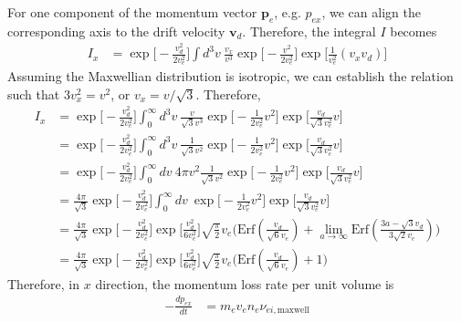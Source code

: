 \documentclass{article}
\begin{document}
For one component of the momentum vector $\bm{p}_e$, e.g. $p_{ex}$, we can align the corresponding axis to the drift velocity $\bm{v}_d$. Therefore, the integral $I$ becomes
\begin{equation}
	\begin{split}
		I_x &=\exp\Big[-\frac{v_d^2}{2v_e^2} \Big] \int d^3v\ \frac{v_x}{v^3} \exp\Big[-\frac{v^2}{2v_e^2} \Big] \exp\Big[\frac{1}{v_e^2}(v_x v_d ) \Big]
	\end{split}
\end{equation}
Assuming the Maxwellian distribution is isotropic, we can establish the relation such that $3v_x^2 = v^2$, or $v_x = v/ \sqrt{3}$. Therefore,
\begin{equation}
	\begin{split}
		I_x &= \exp\Big[-\frac{v_d^2}{2v_e^2} \Big] \int_0^\infty d^3v\ \frac{v}{\sqrt{3} v^3} \exp\Big[-\frac{1}{2v_e^2}v^2 \Big] \exp\Big[\frac{v_d}{\sqrt{3} v_e^2}v \Big] \\
		&= \exp\Big[-\frac{v_d^2}{2v_e^2} \Big] \int_0^\infty d^3v\ \frac{1}{\sqrt{3} v^2} \exp\Big[-\frac{1}{2v_e^2}v^2 \Big] \exp\Big[\frac{v_d}{\sqrt{3} v_e^2}v \Big] \\
		&= \exp\Big[-\frac{v_d^2}{2v_e^2} \Big] \int_0^\infty dv\ 4\pi v^2 \frac{1}{\sqrt{3} v^2} \exp\Big[-\frac{1}{2v_e^2}v^2 \Big] \exp\Big[\frac{v_d}{\sqrt{3} v_e^2}v \Big] \\
		&= \frac{4\pi}{\sqrt{3}} \exp\Big[-\frac{v_d^2}{2v_e^2} \Big] \int_0^\infty dv\ \exp\Big[-\frac{1}{2v_e^2}v^2 \Big] \exp\Big[\frac{v_d}{\sqrt{3} v_e^2}v \Big] \\
		&= \frac{4\pi}{\sqrt{3}} \exp\Big[-\frac{v_d^2}{2v_e^2} \Big] \exp\Big[\frac{v_d^2}{6v_e^2} \Big]\sqrt{\frac{\pi}{2}}v_e \Big(\text{Erf}(\frac{v_d}{\sqrt{6}v_e} ) + \lim_{a\to \infty} \text{Erf}(\frac{3a - \sqrt{3}v_d}{3\sqrt{2}v_e} )  \Big) \\
		&= \frac{4\pi}{\sqrt{3}} \exp\Big[-\frac{v_d^2}{2v_e^2} \Big] \exp\Big[\frac{v_d^2}{6v_e^2} \Big]\sqrt{\frac{\pi}{2}}v_e \Big(\text{Erf}(\frac{v_d}{\sqrt{6}v_e} ) + 1 \Big)
	\end{split}
\end{equation}
Therefore, in $x$ direction, the momentum loss rate per unit volume is
\begin{equation}
	\begin{split}
		-\frac{d p_{ex}}{d t} &= m_e v_e n_e \nu_{ei,\text{maxwell}}
	\end{split}
\end{equation}
\end{document}
